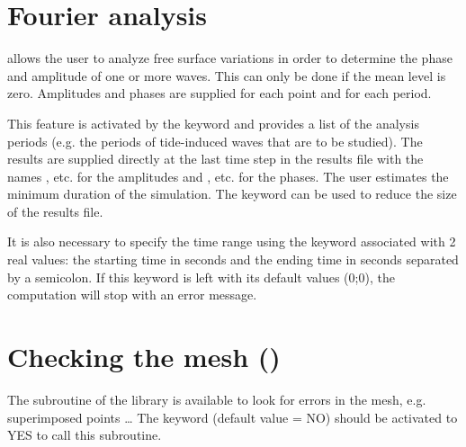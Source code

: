 \section{Fourier analysis}

 allows the user to analyze free surface variations
in order to determine the phase and amplitude of one or more waves.
This can only be done if the mean level is zero.
Amplitudes and phases are supplied for each point and for each period.

This feature is activated by the keyword  and
provides a list of the analysis periods (e.g. the periods of tide-induced waves
that are to be studied).
The results are supplied directly at the last time step in the results file with
the names ,  etc. for the amplitudes
and ,  etc. for the phases.
The user estimates the minimum duration of the simulation.
The keyword 
can be used to reduce the size of the results file.

It is also necessary to specify the time range using the keyword
 associated with 2 real values:
the starting time in seconds and the ending time in seconds separated by a
semicolon.
If this keyword is left with its default values (0;0),
the computation will stop with an error message.

\section{Checking the mesh ()}

The  subroutine of the \bief library is available to look for
errors in the mesh, e.g. superimposed points \ldots
The keyword  (default value = NO) should be activated
to YES to call this subroutine.
